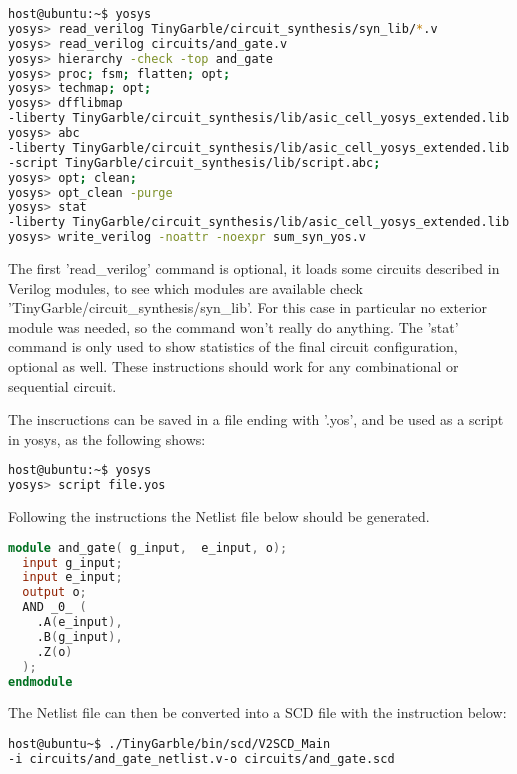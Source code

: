 \begin{refsection}
\begin{lstlisting}[caption={Yosys instructions to compile the combinational circuit Verilog file into a Netlist File. 'Sudo yosys' may be needed.}, language=bash, captionpos=b]
host@ubuntu:~$ yosys
yosys> read_verilog TinyGarble/circuit_synthesis/syn_lib/*.v
yosys> read_verilog circuits/and_gate.v 
yosys> hierarchy -check -top and_gate
yosys> proc; fsm; flatten; opt;
yosys> techmap; opt; 
yosys> dfflibmap 
-liberty TinyGarble/circuit_synthesis/lib/asic_cell_yosys_extended.lib
yosys> abc 
-liberty TinyGarble/circuit_synthesis/lib/asic_cell_yosys_extended.lib 
-script TinyGarble/circuit_synthesis/lib/script.abc; 
yosys> opt; clean; 
yosys> opt_clean -purge
yosys> stat
-liberty TinyGarble/circuit_synthesis/lib/asic_cell_yosys_extended.lib
yosys> write_verilog -noattr -noexpr sum_syn_yos.v				
\end{lstlisting}

The first 'read\_verilog' command is optional, it loads some circuits described in Verilog modules, to see which modules are available check 'TinyGarble/circuit\_synthesis/syn\_lib'. For this case in particular no exterior module was needed, so the command won't really do anything.
The 'stat' command is only used to show statistics of the final circuit configuration, optional as well.
These instructions should work for any combinational or sequential circuit.

The inscructions can be saved in a file ending with '.yos', and be used as a script in yosys, as the following shows:
\begin{lstlisting}[caption={Running yosys instructions contained in a script file.}, language=bash, captionpos=b]
host@ubuntu:~$ yosys
yosys> script file.yos
\end{lstlisting}

\newpage

Following the instructions the Netlist file below should be generated.

\begin{lstlisting}[caption={and\_gate\_netlist.v}, language=Verilog, captionpos=b]
module and_gate( g_input,  e_input, o);
  input g_input;
  input e_input;
  output o;
  AND _0_ (
    .A(e_input),
    .B(g_input),
    .Z(o)
  );
endmodule
\end{lstlisting}

The Netlist file can then be converted into a SCD file with the instruction below:

\begin{lstlisting}[caption={Installation of Yosys-abc}, language=bash, captionpos=b]
host@ubuntu~$ ./TinyGarble/bin/scd/V2SCD_Main 
-i circuits/and_gate_netlist.v-o circuits/and_gate.scd		
\end{lstlisting}


\end{refsection}
